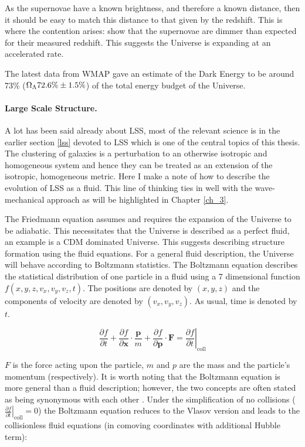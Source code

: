 As the supernovae have a known brightness, and therefore a known distance, then it should be easy to match this distance to that given by the redshift. This is where the contention arises: \citet{bib_riess} show that the supernovae are dimmer than expected for their measured redshift. This suggests the Universe is expanding at an accelerated rate.

The latest data from WMAP \citep{bib_wmap7} gave an estimate of the Dark Energy to be around 73\% ($\Omega_{\rm \Lambda} 72.6\%  \pm  1.5\%$) of the total energy budget of the Universe.


\paragraph{Large Scale Structure.} A lot has been said already about LSS, most of the relevant science is in the earlier section \ref{lss} devoted to LSS which is one of the central topics of this thesis. The clustering of galaxies is a perturbation to an otherwise isotropic and homogeneous system and hence they can be treated as an extension of the isotropic, homogeneous metric. Here I make a note of how to describe the evolution of LSS as a fluid. This line of thinking ties in well with the wave-mechanical approach as will be highlighted in Chapter \ref{ch_3}.

The Friedmann equation assumes and requires the expansion of the Universe to be adiabatic. This necessitates that the Universe is described as a perfect fluid, an example is a CDM dominated Universe. This suggests describing structure formation using the fluid equations. For a general fluid description, the Universe will behave according to Boltzmann statistics. The Boltzmann equation describes the statistical distribution of one particle in a fluid using a 7 dimensional function $f(x,y,z,v_x,v_y,v_z,t)$. The positions are denoted by $(x,y,z)$ and the components of velocity are denoted by $(v_x,v_y,v_z)$. As usual, time is denoted by $t$.

\begin{equation}
\frac{\partial f}{\partial t} + \frac{\partial f}{\partial \mathbf{x}} \cdot \frac{\mathbf{p}}{m} + \frac{\partial f}{\partial \mathbf{p}} \cdot \mathbf{F} = \left. \frac{\partial f}{\partial t} \right|_{\mathrm{coll}}
\end{equation}


\noindent $F$ is the force acting upon the particle, $m$ and $p$ are the mass and the particle's momentum (respectively). It is worth noting that the Boltzmann equation is more general than a fluid description; however, the two concepts are often stated as being synonymous with each other \citep{bib_pea}. Under the simplification of no collisions ($\left. \frac{\partial f}{\partial t} \right|_{\mathrm{coll}} =0 $) the Boltzmann equation reduces to the Vlasov version and leads to the collisionless fluid equations (in comoving coordinates with additional Hubble term):

